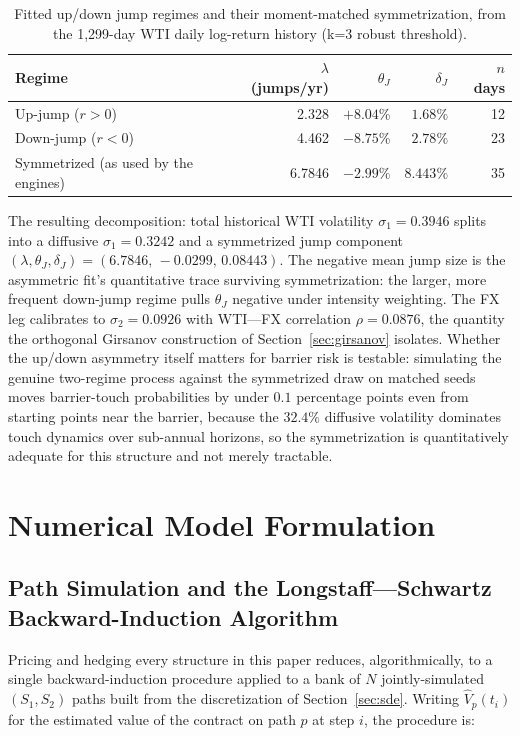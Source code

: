 \documentclass[11pt,a4paper]{article}
\begin{document}
\begin{table}[h]
\centering
\small
\begin{tabular}{lrrrr}
\toprule
Regime & $\lambda$ (jumps/yr) & $\theta_J$ & $\delta_J$ & $n$ days \\
\midrule
Up-jump ($r>0$)   & 2.328 & $+8.04\%$ & $1.68\%$ & 12 \\
Down-jump ($r<0$) & 4.462 & $-8.75\%$ & $2.78\%$ & 23 \\
\midrule
Symmetrized (as used by the engines) & 6.7846 & $-2.99\%$ & $8.443\%$ & 35 \\
\bottomrule
\end{tabular}
\caption{Fitted up/down jump regimes and their moment-matched symmetrization, from the 1,299-day WTI daily log-return history (k=3 robust threshold).}
\label{tab:asymjump}
\end{table}

The resulting decomposition: total historical WTI volatility $\sigma_1=0.3946$ splits into a diffusive $\sigma_1 = 0.3242$ and a symmetrized jump component $(\lambda,\theta_J,\delta_J)=(6.7846,\,-0.0299,\,0.08443)$. The negative mean jump size is the asymmetric fit's quantitative trace surviving symmetrization: the larger, more frequent down-jump regime pulls $\theta_J$ negative under intensity weighting. The FX leg calibrates to $\sigma_2 = 0.0926$ with WTI---FX correlation $\rho = 0.0876$, the quantity the orthogonal Girsanov construction of Section~\ref{sec:girsanov} isolates. Whether the up/down asymmetry itself matters for barrier risk is testable: simulating the genuine two-regime process against the symmetrized draw on matched seeds moves barrier-touch probabilities by under $0.1$ percentage points even from starting points near the barrier, because the $32.4\%$ diffusive volatility dominates touch dynamics over sub-annual horizons, so the symmetrization is quantitatively adequate for this structure and not merely tractable.

\section{Numerical Model Formulation}
\label{sec:numerical}

\subsection{Path Simulation and the Longstaff---Schwartz Backward-Induction Algorithm}
\label{sec:lsmcalgo}

Pricing and hedging every structure in this paper reduces, algorithmically, to a single backward-induction procedure applied to a bank of $N$ jointly-simulated $(S_1,S_2)$ paths built from the discretization of Section~\ref{sec:sde}. Writing $\hat V_p(t_i)$ for the estimated value of the contract on path $p$ at step $i$, the procedure is:
\end{document}
